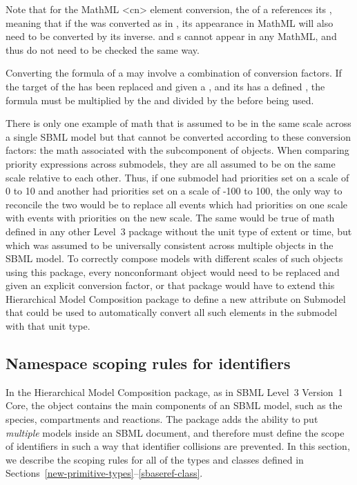 Note that for the MathML <cn> element conversion,
the  of a \Reaction references its \KineticLaw, meaning that if
the \KineticLaw was converted as in , its appearance
in MathML will also need to be converted by its inverse.  \AssignmentRule and \RateRule
{}s cannot appear in any MathML, and thus do not need to be checked
the same way.

Converting the formula of a \RateRule may involve a combination of conversion factors.
If the target of the \RateRule has been replaced
and given a , and its \Submodel has a defined 
, the formula must be multiplied by the 
and divided by the  before being used.

There is only one example of math that is assumed to be in the same scale
across a single SBML model but that cannot be converted according to
these conversion factors:  the math associated with the \Priority
subcomponent of \Event objects.  When comparing priority expressions 
across submodels,
they are all assumed to be on the same scale relative to each other.
Thus, if one submodel had priorities set on a scale of 0 to 10 and another had
priorities set on a scale of -100 to 100, the only way to reconcile the 
two would be to replace all events which had priorities on one scale with
events with priorities on the new scale.
The same would be true of math defined in any other Level~3 package
without the unit type of extent or time, but which was assumed to
be universally consistent across multiple objects in the SBML model.
To correctly compose models with different scales of such objects using
this package, every nonconformant object would need to be replaced and
given an explicit conversion factor, or that package would have to
extend this Hierarchical Model Composition package to define a new
attribute on Submodel that could be used to automatically convert all
such elements in the submodel with that unit type.


\clearpage

\subsection{Namespace scoping rules for identifiers}
\label{namespaces}

In the Hierarchical Model Composition package, as in SBML Level~3
Version~1 Core, the \Model object contains the main components of an
SBML model, such as the species, compartments and reactions.  The
package adds the ability to put \emph{multiple} models inside an SBML
document, and therefore must define the scope of identifiers in such a
way that identifier collisions are prevented.  In this section, we
describe the scoping rules for all of the types and classes defined in
Sections~\ref{new-primitive-types}--\ref{sbaseref-class}.

